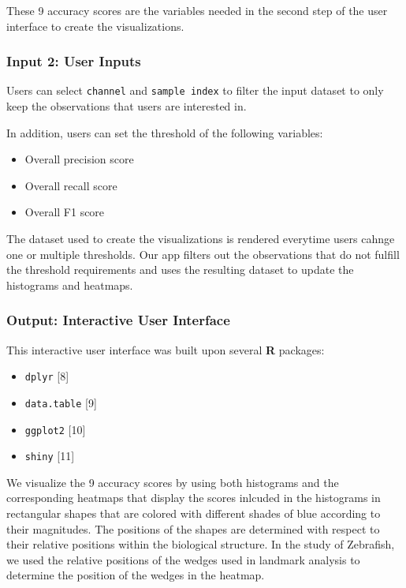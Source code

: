 \documentclass[10pt,letterpaper]{article}
\providecommand{\tightlist}{%
  \setlength{\itemsep}{0pt}\setlength{\parskip}{0pt}}
\begin{document}
These 9 accuracy scores are the variables needed in the second step of
the user interface to create the visualizations.

\subsubsection{Input 2: User Inputs}\label{input-2-user-inputs}

Users can select \texttt{channel} and \texttt{sample\ index} to filter
the input dataset to only keep the observations that users are
interested in.

In addition, users can set the threshold of the following variables:

\begin{itemize}
\tightlist
\item
  Overall precision score
\item
  Overall recall score
\item
  Overall F1 score
\end{itemize}

The dataset used to create the visualizations is rendered everytime
users cahnge one or multiple thresholds. Our app filters out the
observations that do not fulfill the threshold requirements and uses the
resulting dataset to update the histograms and heatmaps.

\subsubsection{Output: Interactive User
Interface}\label{output-interactive-user-interface}

This interactive user interface was built upon several \textbf{R}
packages:

\begin{itemize}
\tightlist
\item
  \texttt{dplyr} {[}8{]}
\item
  \texttt{data.table} {[}9{]}
\item
  \texttt{ggplot2} {[}10{]}
\item
  \texttt{shiny} {[}11{]}
\end{itemize}

We visualize the 9 accuracy scores by using both histograms and the
corresponding heatmaps that display the scores inlcuded in the
histograms in rectangular shapes that are colored with different shades
of blue according to their magnitudes. The positions of the shapes are
determined with respect to their relative positions within the
biological structure. In the study of Zebrafish, we used the relative
positions of the wedges used in landmark analysis to determine the
position of the wedges in the heatmap.
\end{document}

